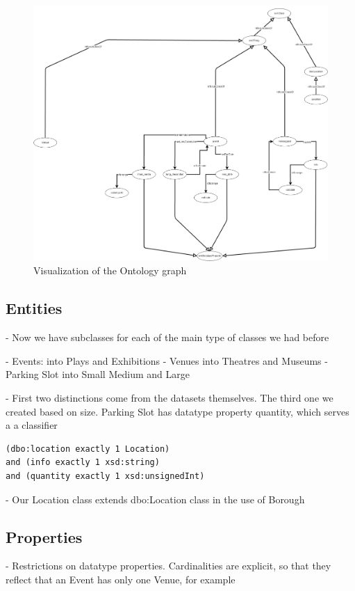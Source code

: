 \documentclass[runningheads,a4paper]{../../StyleFiles/llncs}
\begin{document}
\begin{figure}[h]
	\centering
	\includegraphics[width=.7\textwidth]{img/ontology.png}
	\caption{Visualization of the Ontology graph}
	\label{fig:ontology}
\end{figure}

\subsection{Entities}
- Now we have subclasses for each of the main type of classes we had before

- Events: into Plays and Exhibitions
- Venues into Theatres and Museums
- Parking Slot into Small Medium and Large

- First two distinctions come from the datasets themselves. The third one we created based on size. Parking Slot has datatype property quantity, which serves a a classifier

\begin{lstlisting}[captionpos=b, caption=Definition of Large Slot a subclass of Parking Slot, label=lst:sparql, basicstyle=\ttfamily\small,frame=bt]
(dbo:location exactly 1 Location)
and (info exactly 1 xsd:string)
and (quantity exactly 1 xsd:unsignedInt)
\end{lstlisting}

- Our Location class extends dbo:Location class in the use of Borough

\subsection{Properties}

- Restrictions on datatype properties. Cardinalities are explicit, so that they reflect that an Event has only one Venue, for example
\end{document}
